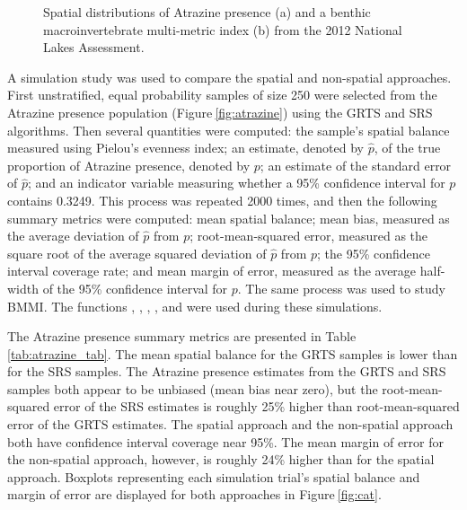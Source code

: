 \documentclass[
  shortnames]{jss}
\begin{document}
\begin{figure}
\begin{subfigure}{0.49\textwidth}
  \caption{}
  \label{fig:bmmi}
\end{subfigure} 
\caption{Spatial distributions of Atrazine presence (a) and a benthic macroinvertebrate multi-metric index (b) from the 2012 National Lakes Assessment.}
\label{fig:simvars}
\end{figure}

A simulation study was used to compare the spatial and non-spatial
approaches. First unstratified, equal probability samples of size 250
were selected from the Atrazine presence population
(Figure\(~\)\ref{fig:atrazine}) using the GRTS and SRS algorithms. Then
several quantities were computed: the sample's spatial balance measured
using Pielou's evenness index; an estimate, denoted by \(\hat{p}\), of
the true proportion of Atrazine presence, denoted by \(p\); an estimate
of the standard error of \(\hat{p}\); and an indicator variable
measuring whether a 95\% confidence interval for \(p\) contains 0.3249.
This process was repeated 2000 times, and then the following summary
metrics were computed: mean spatial balance; mean bias, measured as the
average deviation of \(\hat{p}\) from \(p\); root-mean-squared error,
measured as the square root of the average squared deviation of
\(\hat{p}\) from \(p\); the 95\% confidence interval coverage rate; and
mean margin of error, measured as the average half-width of the 95\%
confidence interval for \(p\). The same process was used to study BMMI.
The  functions , ,
, , and 
were used during these simulations.

The Atrazine presence summary metrics are presented in
Table\(~\)\ref{tab:atrazine_tab}. The mean spatial balance for the GRTS
samples is lower than for the SRS samples. The Atrazine presence
estimates from the GRTS and SRS samples both appear to be unbiased (mean
bias near zero), but the root-mean-squared error of the SRS estimates is
roughly 25\% higher than root-mean-squared error of the GRTS estimates.
The spatial approach and the non-spatial approach both have confidence
interval coverage near 95\%. The mean margin of error for the
non-spatial approach, however, is roughly 24\% higher than for the
spatial approach. Boxplots representing each simulation trial's spatial
balance and margin of error are displayed for both approaches in
Figure\(~\)\ref{fig:cat}.
\end{document}
